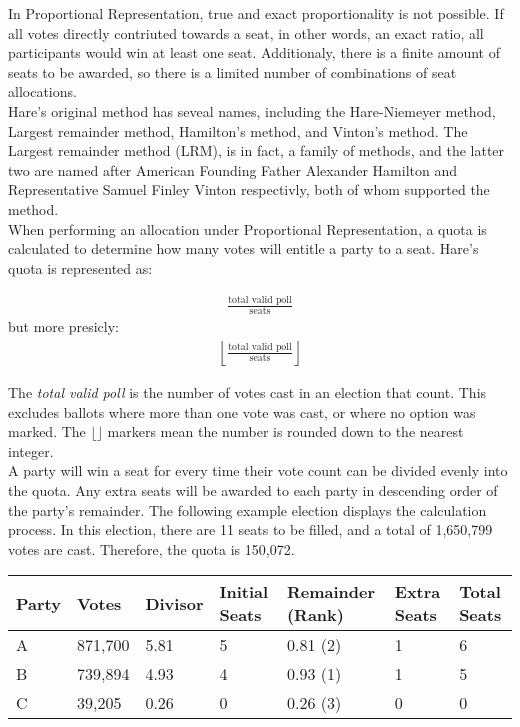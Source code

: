 \documentclass{article}
\begin{document}
    In Proportional Representation, true and exact proportionality is not possible. If all votes directly contriuted towards a seat, in other words, an exact ratio, all participants would win at least one seat. Additionaly, there is a finite amount of seats to be awarded, so there is a limited number of combinations of seat allocations. \\

    Hare's original method has seveal names, including the Hare-Niemeyer method, Largest remainder method, Hamilton's method, and Vinton's method. The Largest remainder method (LRM), is in fact, a family of methods, and the latter two are named after American Founding Father Alexander Hamilton and Representative Samuel Finley Vinton respectivly, both of whom supported the method. \\

    When performing an allocation under Proportional Representation, a quota is calculated to determine how many votes will entitle a party to a seat. Hare's quota is represented as:

    \begin{align}
        \frac{\text{total valid poll}}{\text{seats}}
    \end{align}
    but more presicly:
    \begin{align}
        \left \lfloor \frac{\text{total valid poll}}{\text{seats}} \right \rfloor
    \end{align}

    The \textit{total valid poll} is the number of votes cast in an election that count. This excludes ballots where more than one vote was cast, or where no option was marked. The $\lfloor \rfloor$ markers mean the number is rounded down to the nearest integer.\\

    A party will win a seat for every time their vote count can be divided evenly into the quota. Any extra seats will be awarded to each party in descending order of the party's remainder. The following example election displays the calculation process. In this election, there are 11 seats to be filled, and a total of 1,650,799 votes are cast. Therefore, the quota is 150,072.
    \begin{center} 
    \begin{tabular}{ |l|l|l|l|l|l|l| }
        \hline
        Party & Votes & Divisor & Initial Seats & Remainder (Rank) & Extra Seats & Total Seats \\
        \hline
        A & 871,700 & 5.81 & 5 & 0.81 (2) & 1 & 6 \\
        \hline
        B & 739,894 & 4.93 & 4 & 0.93 (1) & 1 & 5 \\
        \hline
        C & 39,205 & 0.26 & 0 & 0.26 (3) & 0 & 0 \\
        \hline
    \end{tabular}
    \end{center} 
    
\end{document}
